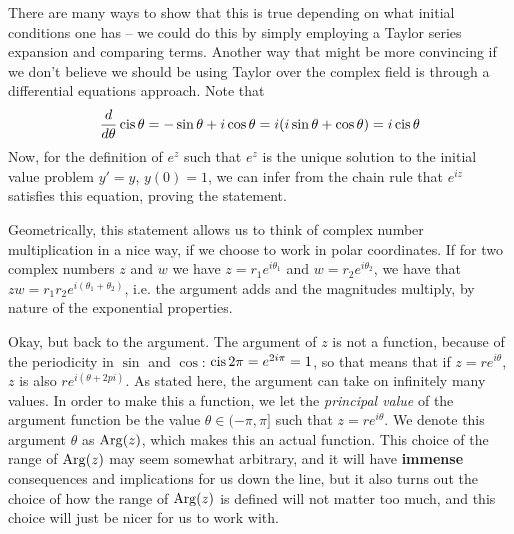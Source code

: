 There are many ways to show that this is true depending on what initial conditions one has -- we could do this by simply employing a Taylor series expansion and comparing terms. Another way that might be more convincing if we don't believe we should be using Taylor over the complex field is through a differential equations approach. Note that
\[
    \frac{d }{d \theta} \operatorname{cis} \theta = -\sin \theta + i \cos \theta = i(i \sin \theta + \cos \theta) = i \operatorname{cis} \theta
\]
Now, for the definition of $e^z$ such that $e^z$ is the unique solution to the initial value problem $y' = y$, $y(0) = 1$, we can infer from the chain rule that $e^{iz}$ satisfies this equation, proving the statement.

Geometrically, this statement allows us to think of complex number multiplication in a nice way, if we choose to work in polar coordinates. If for two complex numbers $z$ and $w$ we have $z = r_1 e^{i\theta_1}$ and $w = r_2 e^{i\theta_2}$, we have that $zw = r_1 r_2 e^{i (\theta_1 + \theta_2)}$, i.e. the argument adds and the magnitudes multiply, by nature of the exponential properties.

Okay, but back to the argument. The argument of $z$ is not a function, because of the periodicity in $\sin$ and $\cos$: $\operatorname{cis} 2\pi = e^{2i \pi} = 1$, so that means that if $z = re^{i\theta}$, $z$ is also $re^{i(\theta + 2pi)}$. As stated here, the argument can take on infinitely many values. In order to make this a function, we let the \textit{principal value} of the argument function be the value $\theta \in (-\pi, \pi]$ such that $z = re^{i\theta}$. We denote this argument $\theta$ as $\operatorname*{Arg}(z)$, which makes this an actual function. This choice of the range of $\operatorname*{Arg}(z)$ may seem somewhat arbitrary, and it will have \textbf{immense} consequences and implications for us down the line, but it also turns out the choice of how the range of $\operatorname*{Arg}(z)$ is defined will not matter too much, and this choice will just be nicer for us to work with.

